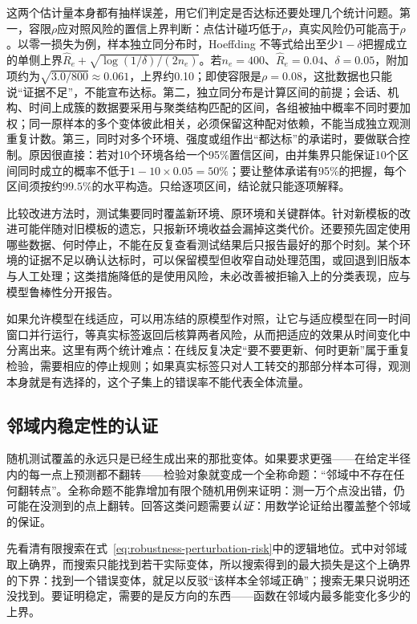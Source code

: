 这两个估计量本身都有抽样误差，用它们判定是否达标还要处理几个统计问题。第一，容限$\rho$应对照风险的置信上界判断：点估计碰巧低于$\rho$，真实风险仍可能高于$\rho$。以零一损失为例，样本独立同分布时，Hoeffding 不等式给出至少$1-\delta$把握成立的单侧上界$\widehat R_e+\sqrt{\log(1/\delta)/(2n_e)}$。若$n_e=400$、$\widehat R_e=0.04$、$\delta=0.05$，附加项约为$\sqrt{3.0/800}\approx0.061$，上界约0.10；即使容限是$\rho=0.08$，这批数据也只能说“证据不足”，不能宣布达标。第二，独立同分布是计算区间的前提；会话、机构、时间上成簇的数据要采用与聚类结构匹配的区间，各组被抽中概率不同时要加权；同一原样本的多个变体彼此相关，必须保留这种配对依赖，不能当成独立观测重复计数。第三，同时对多个环境、强度或组作出“都达标”的承诺时，要做联合控制。原因很直接：若对10个环境各给一个95\%置信区间，由并集界只能保证10个区间同时成立的概率不低于$1-10\times0.05=50\%$；要让整体承诺有95\%的把握，每个区间须按约$99.5\%$的水平构造。只给逐项区间，结论就只能逐项解释。

比较改进方法时，测试集要同时覆盖新环境、原环境和关键群体。针对新模板的改进可能伴随对旧模板的遗忘，只报新环境收益会漏掉这类代价。还要预先固定使用哪些数据、何时停止，不能在反复查看测试结果后只报告最好的那个时刻。某个环境的证据不足以确认达标时，可以保留模型但收窄自动处理范围，或回退到旧版本与人工处理；这类措施降低的是使用风险，未必改善被拒输入上的分类表现，应与模型鲁棒性分开报告。

如果允许模型在线适应，可以用冻结的原模型作对照，让它与适应模型在同一时间窗口并行运行，等真实标签返回后核算两者风险，从而把适应的效果从时间变化中分离出来。这里有两个统计难点：在线反复决定“要不要更新、何时更新”属于重复检验，需要相应的停止规则；如果真实标签只对人工转交的那部分样本可得，观测本身就是有选择的，这个子集上的错误率不能代表全体流量。

\subsection{邻域内稳定性的认证}
\label{sec:robustness-certification}

随机测试覆盖的永远只是已经生成出来的那批变体。如果要求更强——在给定半径内的每一点上预测都不翻转——检验对象就变成一个全称命题：“邻域中不存在任何翻转点”。全称命题不能靠增加有限个随机用例来证明：测一万个点没出错，仍可能在没测到的点上翻转。回答这类问题需要\emph{认证}：用数学论证给出覆盖整个邻域的保证。

先看清有限搜索在式~\eqref{eq:robustness-perturbation-risk}中的逻辑地位。式中对邻域取上确界，而搜索只能找到若干实际变体，所以搜索得到的最大损失是这个上确界的下界：找到一个错误变体，就足以反驳“该样本全邻域正确”；搜索无果只说明还没找到。要证明稳定，需要的是反方向的东西——函数在邻域内最多能变化多少的上界。

